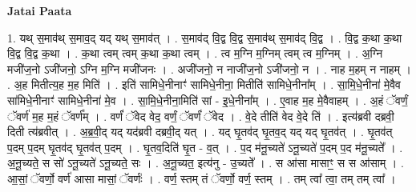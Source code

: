 \documentclass[17pt]{extarticle}
\begin{document}
\textbf{Jatai Paata} \newline

1. यथ् स॒माव॑थ् स॒माव॒द् यद् यथ् स॒माव॑त् । . स॒माव॑द् वि॒द्व वि॒द्व स॒माव॑थ् स॒माव॑द् वि॒द्व । . वि॒द्व क॒था क॒था वि॒द्व वि॒द्व क॒था । . क॒था त्वम् त्वम् क॒था क॒था त्वम् । . त्व म॒ग्नि म॒ग्निम् त्वम् त्व म॒ग्निम् । . अ॒ग्नि मजी॑ज॒नो ऽजी॑जनो॒ ऽग्नि म॒ग्नि मजी॑जनः । . अजी॑जनो॒ न नाजी॑ज॒नो ऽजी॑जनो॒ न । . नाह म॒हम् न नाहम् । . अ॒ह मितीत्य॒ह म॒ह मिति॑ । . इति॑ सामिधे॒नीनाꣳ॑ सामिधे॒नीना॒ मितीति॑ सामिधे॒नीना᳚म् । . सा॒मि॒धे॒नीना॑ मे॒वैव सा॑मिधे॒नीनाꣳ॑ सामिधे॒नीना॑ मे॒व । . सा॒मि॒धे॒नीना॒मिति॑ सां - इ॒धे॒नीना᳚म् । . ए॒वाह म॒ह मे॒वैवाहम् । . अ॒हं ॅवर्णं॒ ॅवर्ण॑ म॒ह म॒हं ॅवर्ण᳚म् । . वर्णं॑ ॅवेद वेद॒ वर्णं॒ ॅवर्णं॑ ॅवेद । . वे॒दे तीति॑ वेद वे॒दे ति॑ । . इत्य॑ब्रवी दब्रवी॒ दिती त्य॑ब्रवीत् । . अ॒ब्र॒वी॒द् यद् यद॑ब्रवी दब्रवी॒द् यत् । . यद् घृ॒तव॑द् घृ॒तव॒द् यद् यद् घृ॒तव॑त् । . घृ॒तव॑त् प॒दम् प॒दम् घृ॒तव॑द् घृ॒तव॑त् प॒दम् । . घृ॒तव॒दिति॑ घृ॒त - व॒त् । . प॒द म॑नू॒च्यते॑ ऽनू॒च्यते॑ प॒दम् प॒द म॑नू॒च्यते᳚ । . अ॒नू॒च्यते॒ स सो॑ ऽनू॒च्यते॑ ऽनू॒च्यते॒ सः । . अ॒नू॒च्यत॒ इत्य॑नु - उ॒च्यते᳚ । . स आ॑सा मासाꣳ॒॒ स स आ॑साम् । . आ॒सां॒ ॅवर्णो॒ वर्ण॑ आसा मासां॒ ॅवर्णः॑ । . वर्ण॒ स्तम् तं ॅवर्णो॒ वर्ण॒ स्तम् । . तम् त्वा᳚ त्वा॒ तम् तम् त्वा᳚ । \newline
\end{document}
